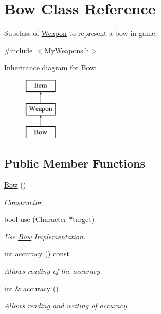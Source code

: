\hypertarget{classBow}{\section{Bow Class Reference}
\label{classBow}
}


Subclass of \hyperlink{classWeapon}{Weapon} to represent a bow in game.  




{\ttfamily \#include $<$My\-Weapons.\-h$>$}

Inheritance diagram for Bow\-:\begin{figure}[H]
\begin{center}
\leavevmode
\includegraphics[height=3.000000cm]{classBow}
\end{center}
\end{figure}
\subsection*{Public Member Functions}
\begin{DoxyCompactItemize}
\item 
\hyperlink{classBow_ae13f3721e07f62cacca7dc87e7cd3e09}{Bow} ()
\begin{DoxyCompactList}\small\item\em Constructor. \end{DoxyCompactList}\item 
bool \hyperlink{classBow_a19250cbc06d6bd21f83be645e880fd76}{use} (\hyperlink{classCharacter}{Character} $\ast$target)
\begin{DoxyCompactList}\small\item\em Use \hyperlink{classBow}{Bow} Implementation. \end{DoxyCompactList}\item 
int \hyperlink{classBow_acf3a40fb7f8d2320677da3948e1e6930}{accuracy} () const 
\begin{DoxyCompactList}\small\item\em Allows reading of the accuracy. \end{DoxyCompactList}\item 
int \& \hyperlink{classBow_a2d68e17d2f9f39b4decce2ab90cc180b}{accuracy} ()
\begin{DoxyCompactList}\small\item\em Allows reading and writing of accuracy. \end{DoxyCompactList}\end{DoxyCompactItemize}

